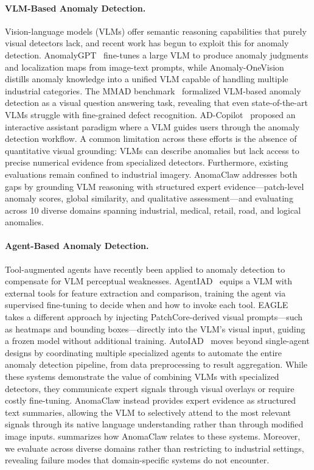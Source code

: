 \paragraph{VLM-Based Anomaly Detection.}
Vision-language models (VLMs) offer semantic reasoning capabilities that purely visual detectors lack, and recent work has begun to exploit this for anomaly detection.
AnomalyGPT~\cite{gu2024anomalygpt} fine-tunes a large VLM to produce anomaly judgments and localization maps from image-text prompts, while Anomaly-OneVision~\cite{cao2025anomalyonevision} distills anomaly knowledge into a unified VLM capable of handling multiple industrial categories.
The MMAD benchmark~\cite{jiang2024mmad} formalized VLM-based anomaly detection as a visual question answering task, revealing that even state-of-the-art VLMs struggle with fine-grained defect recognition.
AD-Copilot~\cite{zhang2026adcopilot} proposed an interactive assistant paradigm where a VLM guides users through the anomaly detection workflow.
A common limitation across these efforts is the absence of quantitative visual grounding: VLMs can describe anomalies but lack access to precise numerical evidence from specialized detectors.
Furthermore, existing evaluations remain confined to industrial imagery.
AnomaClaw addresses both gaps by grounding VLM reasoning with structured expert evidence---patch-level anomaly scores, global similarity, and qualitative assessment---and evaluating across 10 diverse domains spanning industrial, medical, retail, road, and logical anomalies.

\paragraph{Agent-Based Anomaly Detection.}
Tool-augmented agents have recently been applied to anomaly detection to compensate for VLM perceptual weaknesses.
AgentIAD~\cite{zhang2025agentiad} equips a VLM with external tools for feature extraction and comparison, training the agent via supervised fine-tuning to decide when and how to invoke each tool.
EAGLE~\cite{chen2026eagle} takes a different approach by injecting PatchCore-derived visual prompts---such as heatmaps and bounding boxes---directly into the VLM's visual input, guiding a frozen model without additional training.
AutoIAD~\cite{wei2025autoiad} moves beyond single-agent designs by coordinating multiple specialized agents to automate the entire anomaly detection pipeline, from data preprocessing to result aggregation.
While these systems demonstrate the value of combining VLMs with specialized detectors, they communicate expert signals through visual overlays or require costly fine-tuning.
AnomaClaw instead provides expert evidence as structured text summaries, allowing the VLM to selectively attend to the most relevant signals through its native language understanding rather than through modified image inputs.
 summarizes how AnomaClaw relates to these systems.
Moreover, we evaluate across diverse domains rather than restricting to industrial settings, revealing failure modes that domain-specific systems do not encounter.

